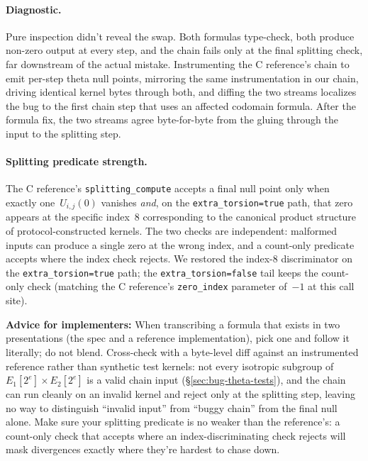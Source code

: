 \paragraph{Diagnostic.}
Pure inspection didn't reveal the swap.  Both formulas
type-check, both produce non-zero output at every step, and the
chain fails only at the final splitting check, far downstream of
the actual mistake.  Instrumenting the C reference's chain to
emit per-step theta null points, mirroring the same
instrumentation in our chain, driving identical kernel bytes
through both, and diffing the two streams localizes the bug to
the first chain step that uses an affected codomain formula.
After the formula fix, the two streams agree byte-for-byte from
the gluing through the input to the splitting step.

\paragraph{Splitting predicate strength.}
The C reference's
\texttt{splitting\_compute} accepts a final null point only when
exactly one~$U_{i,j}(0)$ vanishes \emph{and}, on the
\texttt{extra\_torsion=true} path, that zero appears at the
specific index~8 corresponding to the canonical product structure
of protocol-constructed kernels.  The two checks are independent:
malformed inputs can produce a single zero at the wrong index, and
a count-only predicate accepts where the index check rejects.  We
restored the index-8 discriminator on the
\texttt{extra\_torsion=true} path; the
\texttt{extra\_torsion=false} tail keeps the count-only check
(matching the C reference's \texttt{zero\_index} parameter
of~$-1$ at this call site).

\noindent
\textbf{Advice for implementers:} When transcribing a formula that
exists in two presentations (the spec and a reference
implementation), pick one and follow it literally; do not blend.
Cross-check with a byte-level diff against an instrumented
reference rather than synthetic test kernels: not every isotropic
subgroup of $E_1[2^e] \times E_2[2^e]$ is a valid chain input
(§\ref{sec:bug-theta-tests}), and the chain can run cleanly on an
invalid kernel and reject only at the splitting step, leaving no
way to distinguish ``invalid input'' from ``buggy chain'' from the
final null alone.  Make sure your splitting predicate is no weaker
than the reference's: a count-only check that accepts where an
index-discriminating check rejects will mask divergences exactly
where they're hardest to chase down.

